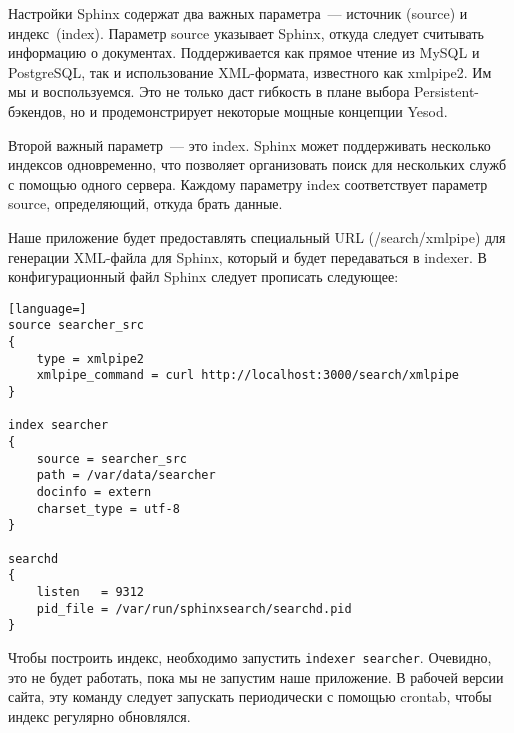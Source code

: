 Настройки Sphinx содержат два важных параметра~--- источник (source) и
индекс~(index). Параметр source указывает Sphinx, откуда следует считывать
информацию о документах. Поддерживается как прямое чтение из MySQL и
PostgreSQL, так и использование XML-формата, известного как xmlpipe2. Им мы и
воспользуемся. Это не только даст гибкость в плане выбора Persistent-бэкендов,
но и продемонстрирует некоторые мощные концепции Yesod.

Второй важный параметр~--- это index. Sphinx может поддерживать несколько
индексов одновременно, что позволяет организовать поиск для нескольких служб с
помощью одного сервера. Каждому параметру index соответствует параметр source,
определяющий, откуда брать данные.

Наше приложение будет предоставлять специальный URL (/search/xmlpipe) для
генерации XML-файла для Sphinx, который и будет передаваться в indexer. В
конфигурационный файл Sphinx следует прописать следующее:
\begin{lstlisting}[language=]
source searcher_src
{
    type = xmlpipe2
    xmlpipe_command = curl http://localhost:3000/search/xmlpipe
}

index searcher
{
    source = searcher_src
    path = /var/data/searcher
    docinfo = extern
    charset_type = utf-8
}

searchd
{
    listen   = 9312
    pid_file = /var/run/sphinxsearch/searchd.pid
}
\end{lstlisting}

Чтобы построить индекс, необходимо запустить \lstinline!indexer searcher!.
Очевидно, это не будет работать, пока мы не запустим наше приложение. В рабочей
версии сайта, эту команду следует запускать периодически с помощью crontab,
чтобы индекс регулярно обновлялся.

